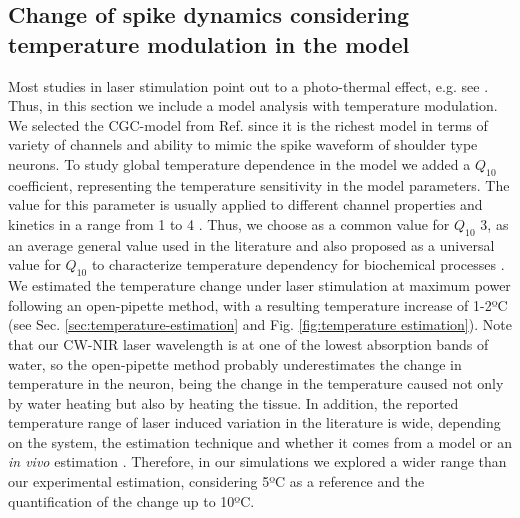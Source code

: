 \subsection{Change of spike dynamics considering temperature modulation in the model}
\label{sect:temperature model}
Most studies in laser stimulation point out to a photo-thermal effect, e.g. see \parencite{wells_biophysical_2007, shapiro_infrared_2012, li_temporal_2013, rabbitt_heat_2016, ganguly_modeling_2016, cury_infrared_2021, pan_infrared_2023}. Thus, in this section we include a model analysis with temperature modulation. We selected the CGC-model from Ref. \parencite{vavoulis_balanced_2010} since it is the richest model in terms of variety of channels and ability to mimic the spike waveform of shoulder type neurons. To study global temperature dependence in the model we added a $Q_{10}$ coefficient, representing the temperature sensitivity in the model parameters. The value for this parameter is usually applied to different channel properties and kinetics in a range from 1 to 4 \parencite{schauf_temperature_1973,cosens_temperature-dependence_1976,tang_precise_2010,alonso_temperature_2020}. 
Thus, we choose as a common value for $Q_{10}$ 3, as an average general value used in the literature \parencite{hodgkin_effect_1949,heitler_effect_1998,shapiro_infrared_2012, li_temporal_2013, rabbitt_heat_2016,ganguly_thermal_2019-1} and also proposed as a universal value for $Q_{10}$ to characterize temperature dependency for biochemical processes \parencite{elias_universality_2014}. We estimated the temperature change under laser stimulation at maximum power following an open-pipette method, with a resulting temperature increase of 1-2ºC (see Sec. \ref{sec:temperature-estimation} and Fig. \ref{fig:temperature estimation}). Note that our CW-NIR laser wavelength is at one of the lowest absorption bands of water, so the open-pipette method probably underestimates the change in temperature in the neuron, being the change in the temperature caused not only by water heating but also by heating the tissue. In addition, the reported temperature range of laser induced variation in the literature is wide, depending on the system, the estimation technique and whether it comes from a model or an \textit{in vivo} estimation \parencite{shapiro_infrared_2012, rabbitt_heat_2016, thompson_modeling_2012}. Therefore, in our simulations we explored a wider range than our experimental estimation, considering 5ºC as a reference and the quantification of the change up to 10ºC.

